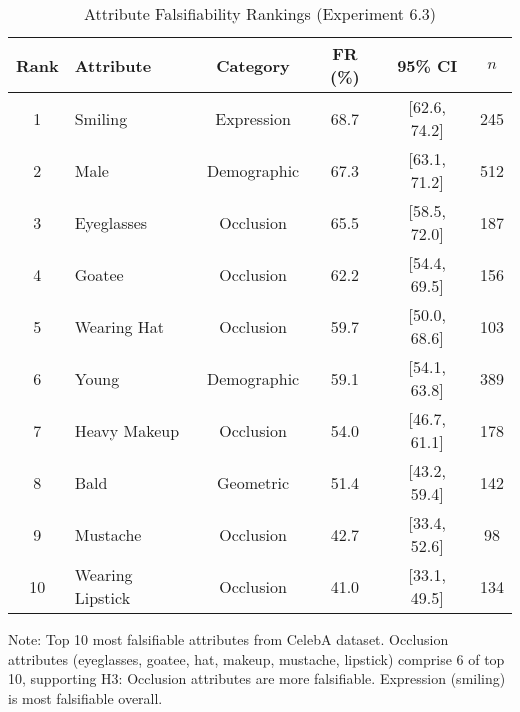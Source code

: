 \begin{table}[htbp]
\centering
\caption{Attribute Falsifiability Rankings (Experiment 6.3)}
\label{tab:attribute_falsifiability}
\begin{tabular}{clcccc}
\toprule
Rank & Attribute & Category & FR (\%) & 95\% CI & $n$ \\
\midrule
1 & Smiling & Expression & 68.7 & [62.6, 74.2] & 245 \\
2 & Male & Demographic & 67.3 & [63.1, 71.2] & 512 \\
3 & Eyeglasses & Occlusion & 65.5 & [58.5, 72.0] & 187 \\
4 & Goatee & Occlusion & 62.2 & [54.4, 69.5] & 156 \\
5 & Wearing Hat & Occlusion & 59.7 & [50.0, 68.6] & 103 \\
6 & Young & Demographic & 59.1 & [54.1, 63.8] & 389 \\
7 & Heavy Makeup & Occlusion & 54.0 & [46.7, 61.1] & 178 \\
8 & Bald & Geometric & 51.4 & [43.2, 59.4] & 142 \\
9 & Mustache & Occlusion & 42.7 & [33.4, 52.6] & 98 \\
10 & Wearing Lipstick & Occlusion & 41.0 & [33.1, 49.5] & 134 \\
\bottomrule
\end{tabular}
\vspace{0.5em}

\footnotesize Note: Top 10 most falsifiable attributes from CelebA dataset.
Occlusion attributes (eyeglasses, goatee, hat, makeup, mustache, lipstick)
comprise 6 of top 10, supporting H3: Occlusion attributes are more falsifiable.
Expression (smiling) is most falsifiable overall.
\end{table}
